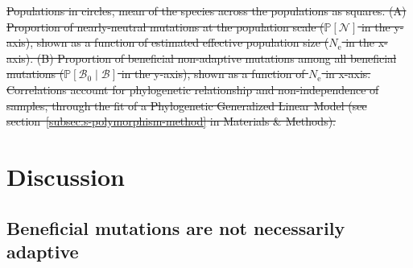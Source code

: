\documentclass{article} %
\newcommand{\Ne}{N_{\text{e}}}
\newcommand{\proba}{\mathbb{P}}
\newcommand{\SphyBen}{\mathcal{B}_0}
\newcommand{\given}{\mid}
\newcommand{\SpopNeu}{\mathcal{N}}
\newcommand{\SpopBen}{\mathcal{B}}
\providecommand{\DIFdeltex}[1]{{\protect\color{red}\sout{#1}}}                      %
\providecommand{\DIFdelend}{} %
\providecommand{\DIFdelFL}[1]{\DIFdel{#1}} %
\providecommand{\DIFdel}[1]{\texorpdfstring{\DIFdeltex{#1}}{}} %
\DeclareRobustCommand{\DIFdelend}{\DIFOaddend \let\includegraphics\DIFOincludegraphics} %
\begin{document}

{%
\DIFdelFL{Populations in circles, mean of the species across the populations as squares.
              (A) Proportion of nearly-neutral mutations at the population scale ($\proba [ \SpopNeu]$ in the y-axis), shown as a function of estimated effective population size ($\Ne$ in the x-axis).
              (B) Proportion of beneficial non-adaptive mutations among all beneficial mutations ($\proba [ \SphyBen  \given  \SpopBen]$ in the y-axis), shown as a function of $\Ne$ in x-axis.
              Correlations account for phylogenetic relationship and non-independence of samples, through the fit of a Phylogenetic Generalized Linear Model (see section~\ref{subsec:s-polymorphism-method} in Materials \& Methods).
       }}

\DIFdelend \section*{Discussion}
    \subsection*{Beneficial mutations are not necessarily adaptive}
\end{document}
